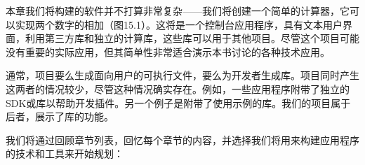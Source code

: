 本章我们将构建的软件并不打算非常复杂——我们将创建一个简单的计算器，它可以实现两个数字的相加（图15.1）。这将是一个控制台应用程序，具有文本用户界面，利用第三方库和独立的计算库，这些库可以用于其他项目。尽管这个项目可能没有重要的实际应用，但其简单性非常适合演示本书讨论的各种技术应用。


通常，项目要么生成面向用户的可执行文件，要么为开发者生成库。项目同时产生这两者的情况较少，尽管这种情况确实存在。例如，一些应用程序附带了独立的SDK或库以帮助开发插件。另一个例子是附带了使用示例的库。我们的项目属于后者，展示了库的功能。

我们将通过回顾章节列表，回忆每个章节的内容，并选择我们将用来构建应用程序的技术和工具来开始规划：

